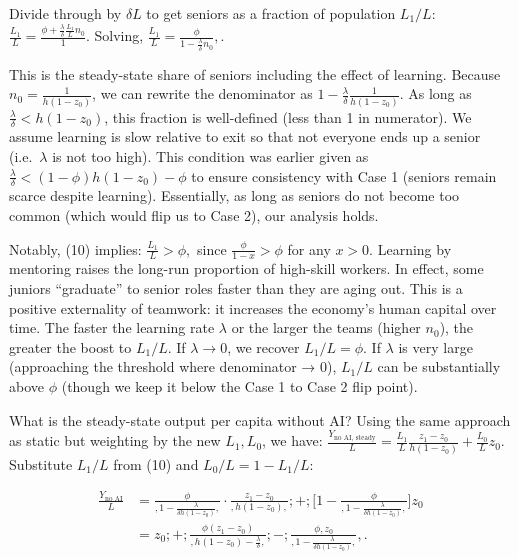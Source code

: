 \documentclass[12pt]{article}
\begin{document}
Divide through by \(\delta L\) to get seniors as a fraction of
population \(L_1/L\):
\(\frac{L_1}{L} = \frac{\phi + \frac{\lambda}{\delta} \frac{L_1}{L} n_0}{1}.\)
Solving, $ \frac{L_1}{L} =
\frac{\phi}{1 - \frac{\lambda}{\delta} n_0},. \tag{10}$

This is the steady-state share of seniors including the effect of
learning. Because \(n_0 = \frac{1}{h(1-z_0)}\), we can rewrite the
denominator as \(1 - \frac{\lambda}{\delta}\frac{1}{h(1-z_0)}\). As long
as \(\frac{\lambda}{\delta} < h(1-z_0)\), this fraction is well-defined
(less than 1 in numerator). We assume {learning is slow relative
to exit} so that not everyone ends up a senior (i.e.~\(\lambda\) is not
too high). This condition was earlier given as
\(\frac{\lambda}{\delta} < (1-\phi)h(1-z_0) - \phi\) to ensure
consistency with Case 1 (seniors remain scarce despite learning).
Essentially, as long as seniors do not become too common (which would
flip us to Case 2), our analysis holds.

Notably, (10) implies: \(\frac{L_1}{L} > \phi,\) since
\(\frac{\phi}{1 - x} > \phi\) for any \(x>0\). {Learning by
mentoring raises the long-run proportion of high-skill workers.} In
effect, some juniors ``graduate'' to senior roles faster than they are
aging out. This is a positive externality of teamwork: it increases the
economy's human capital over time. The faster the learning rate
\(\lambda\) or the larger the teams (higher \(n_0\)), the greater the
boost to \(L_1/L\). If \(\lambda \to 0\), we recover \(L_1/L = \phi\).
If \(\lambda\) is very large (approaching the threshold where
denominator → 0), \(L_1/L\) can be substantially above \(\phi\) (though
we keep it below the Case 1 to Case 2 flip point).

What is the {steady-state output per capita} without AI? Using
the same approach as static but weighting by the new \(L_1, L_0\), we
have:
\(\frac{Y_{\text{no AI, steady}}}{L} = \frac{L_1}{L} \frac{z_1 - z_0}{h(1-z_0)} + \frac{L_0}{L} z_0.\)
Substitute \(L_1/L\) from (10) and \(L_0/L = 1 - L_1/L\):

\begin{align*}
\frac{Y_{\text{no AI}}}{L} &= \frac{\phi}{,1 - \frac{\lambda}{\delta h(1-z_0)},} \cdot \frac{z_1 - z_0}{,h(1-z_0),} ;+; \Big[1 - \frac{\phi}{,1 - \frac{\lambda}{\delta h(1-z_0)},}\Big] z_0 \\
&= z_0 ;+; \frac{\phi (z_1 - z_0)}{,h(1-z_0) - \frac{\lambda}{\delta},} ;-; \frac{\phi, z_0}{,1 - \frac{\lambda}{\delta h(1-z_0)},},.
\end{align*}
\end{document}
